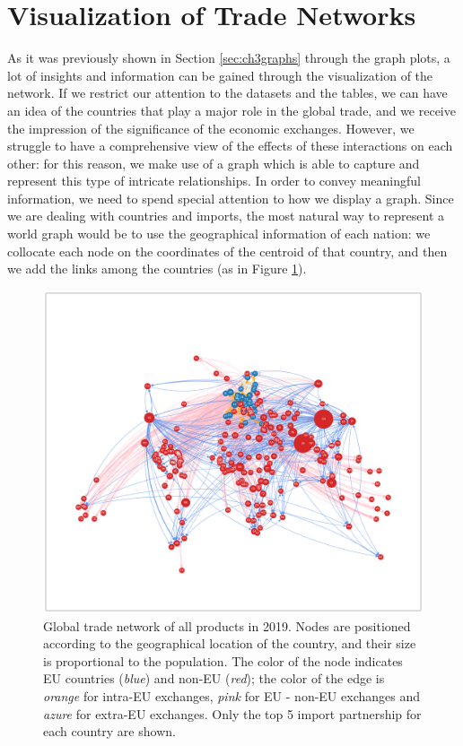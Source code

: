 \pagebreak
\section{Visualization of Trade Networks}

As it was previously shown in Section \ref{sec:ch3graphs} through the graph plots, a lot of insights and information can be gained through the visualization of the network. If we restrict our attention to the datasets and the tables, we can have an idea of the countries that play a major role in the global trade, and we receive the impression of the significance of the economic exchanges. However, we struggle to have a comprehensive view of the effects of these interactions on each other: for this reason, we make use of a graph which is able to capture and represent this type of intricate relationships. In order to convey meaningful information, we need to spend special attention to how we display a graph. Since we are dealing with countries and imports, the most natural way to represent a world graph would be to use the geographical information of each nation: we collocate each node on the coordinates of the centroid of that country, and then we add the links among the countries (as in Figure \ref{fig:geograph}).
\begin{figure}
    \centering
    \includegraphics[width=\textwidth]{pics/full_y19_pTO_geo.png}
    \caption[Global trade network of all products in 2019.]{Global trade network of all products in 2019. Nodes are positioned according to the geographical location of the country, and their size is proportional to the population. The color of the node indicates EU countries (\textit{blue}) and non-EU (\textit{red}); the color of the edge is \textit{orange} for intra-EU exchanges, \textit{pink} for EU - non-EU exchanges and \textit{azure} for extra-EU exchanges. Only the top 5 import partnership for each country are shown.}
    \label{fig:geograph}
\end{figure}
